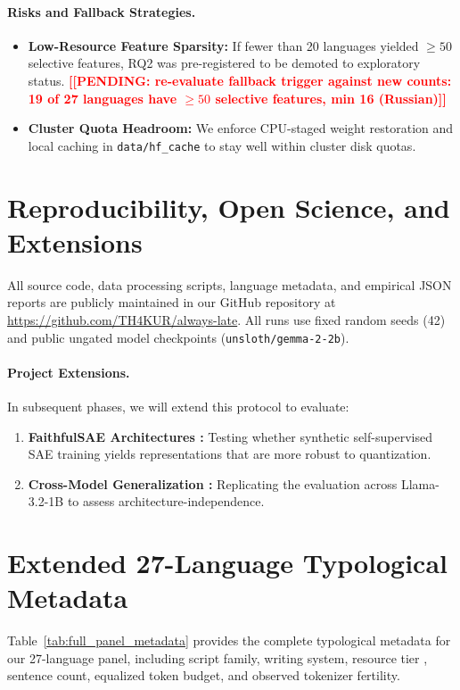 \documentclass[11pt]{article}
\newcommand{\TODO}[1]{\textbf{\textcolor{red}{[[#1]]}}}
\begin{document}
\paragraph{Risks and Fallback Strategies.}
\begin{itemize}
    \item \textbf{Low-Resource Feature Sparsity:} If fewer than 20 languages yielded $\ge 50$ selective features, RQ2 was pre-registered to be demoted to exploratory status. \TODO{PENDING: re-evaluate fallback trigger against new counts: 19 of 27 languages have $\ge 50$ selective features, min 16 (Russian)}
    \item \textbf{Cluster Quota Headroom:} We enforce CPU-staged weight restoration and local caching in \texttt{data/hf\_cache} to stay well within cluster disk quotas.
\end{itemize}

\section{Reproducibility, Open Science, and Extensions}
All source code, data processing scripts, language metadata, and empirical JSON reports are publicly maintained in our GitHub repository at \url{https://github.com/TH4KUR/always-late}. All runs use fixed random seeds (42) and public ungated model checkpoints (\texttt{unsloth/gemma-2-2b}). 

\paragraph{Project Extensions.}
In subsequent phases, we will extend this protocol to evaluate:
\begin{enumerate}
    \item \textbf{FaithfulSAE Architectures \citep{cho2025faithfulsae}:} Testing whether synthetic self-supervised SAE training yields representations that are more robust to quantization.
    \item \textbf{Cross-Model Generalization \citep{he2024llama}:} Replicating the evaluation across Llama-3.2-1B to assess architecture-independence.
\end{enumerate}




\clearpage
\appendix
\section{Extended 27-Language Typological Metadata}
\label{sec:appendix_panel}
Table~\ref{tab:full_panel_metadata} provides the complete typological metadata for our 27-language panel, including script family, writing system, resource tier \citep{joshi2020state}, sentence count, equalized token budget, and observed tokenizer fertility.
\end{document}
